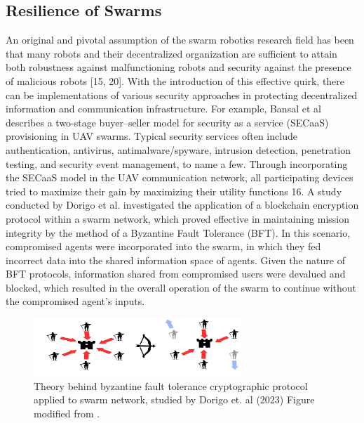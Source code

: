 \subsection*{Resilience of Swarms}
An original and pivotal assumption of the swarm robotics research field has been that many robots and their decentralized organization are sufficient to attain both robustness against malfunctioning robots and security against the presence of malicious robots [15, 20]. With the introduction of this effective quirk, there can be implementations of various security approaches in protecting decentralized information and communication infrastructure. For example, Bansal et al describes a two-stage buyer–seller model for security as a service (SECaaS) provisioning in UAV swarms. Typical security services often include authentication, antivirus, antimalware/spyware, intrusion detection, penetration testing, and security event management, to name a few. Through incorporating the SECaaS model in the UAV communication network, all participating devices tried to maximize their gain by maximizing their utility functions 16. 
A study conducted by Dorigo et al. investigated the application of a blockchain encryption protocol within a swarm network, which proved effective in maintaining mission integrity by the method of a Byzantine Fault Tolerance (BFT). In this scenario, compromised agents were incorporated into the swarm, in which they fed incorrect data into the shared information space of agents. Given the nature of BFT protocols, information shared from compromised users were devalued and blocked, which resulted in the overall operation of the swarm to continue without the compromised agent's inputs. 
\begin{figure}[!h]
  \centering
  \includegraphics[width=0.7\textwidth]{BFT.jpg}
  \caption{Theory behind byzantine fault tolerance cryptographic protocol applied to swarm network, studied by Dorigo et. al (2023)  Figure
    modified from \cite{haury78}.}
  \label{fig:platforms}
\end{figure}
